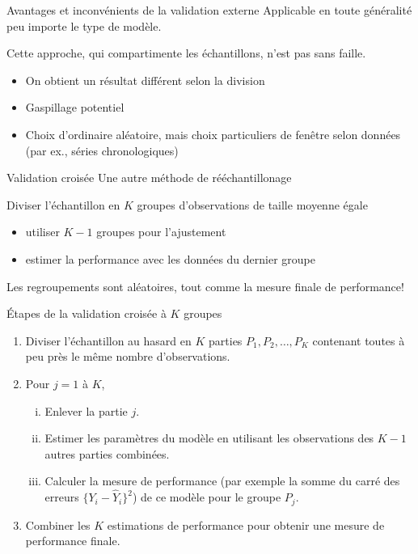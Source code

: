 \documentclass[
  ignorenonframetext,
]{beamer}
\providecommand{\tightlist}{%
  \setlength{\itemsep}{0pt}\setlength{\parskip}{0pt}}\usepackage{longtable,booktabs,array}
\begin{document}
\begin{frame}{Avantages et inconvénients de la validation externe}
\protect\hypertarget{avantages-et-inconvuxe9nients-de-la-validation-externe}{}
Applicable en toute généralité peu importe le type de modèle.

Cette approche, qui compartimente les échantillons, n'est pas sans
faille.

\begin{itemize}
\tightlist
\item
  On obtient un résultat différent selon la division
\item
  Gaspillage potentiel
\item
  Choix d'ordinaire aléatoire, mais choix particuliers de fenêtre selon
  données (par ex., séries chronologiques)
\end{itemize}
\end{frame}

\begin{frame}{Validation croisée}
\protect\hypertarget{validation-croisuxe9e}{}
Une autre méthode de rééchantillonage

Diviser l'échantillon en \(K\) groupes d'observations de taille moyenne
égale

\begin{itemize}
\tightlist
\item
  utiliser \(K-1\) groupes pour l'ajustement
\item
  estimer la performance avec les données du dernier groupe
\end{itemize}

Les regroupements sont aléatoires, tout comme la mesure finale de
performance!
\end{frame}

\begin{frame}{Étapes de la validation croisée à \(K\) groupes}
\protect\hypertarget{uxe9tapes-de-la-validation-croisuxe9e-uxe0-k-groupes}{}
\begin{enumerate}
\tightlist
\item
  Diviser l'échantillon au hasard en \(K\) parties
  \(P_1, P_2, \ldots, P_K\) contenant toutes à peu près le même nombre
  d'observations.
\item
  Pour \(j = 1\) à \(K\),

  \begin{enumerate}
  [i.]
  \tightlist
  \item
    Enlever la partie \(j\).
  \item
    Estimer les paramètres du modèle en utilisant les observations des
    \(K-1\) autres parties combinées.
  \item
    Calculer la mesure de performance (par exemple la somme du carré des
    erreurs \(\{Y_i - \widehat{Y}_i\}^2\)) de ce modèle pour le groupe
    \(P_j\).
  \end{enumerate}
\item
  Combiner les \(K\) estimations de performance pour obtenir une mesure
  de performance finale.
\end{enumerate}
\end{frame}
\end{document}
